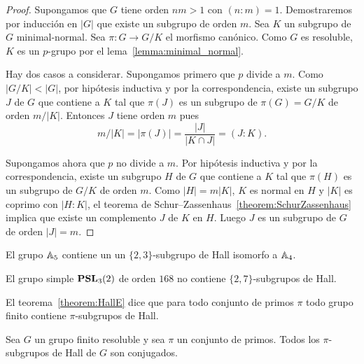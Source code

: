 \begin{proof}
	Supongamos que $G$ tiene orden $nm>1$ con $(n:m)=1$. Demostraremos por
	inducción en $|G|$ que 	existe un subgrupo de orden $m$. Sea $K$ un
	subgrupo de $G$ minimal-normal. Sea $\pi\colon G\to G/K$ el morfismo
	canónico.  Como $G$ es resoluble, $K$ es un $p$-grupo por el
	lema~\ref{lemma:minimal_normal}.
	
	Hay dos casos a considerar.  Supongamos primero que $p$ divide a $m$. Como
	$|G/K|<|G|$, por hipótesis inductiva y por la correspondencia, existe un
	subgrupo $J$ de $G$ que contiene a $K$ tal que $\pi(J)$ es un subgrupo de
	$\pi(G)=G/K$ de orden $m/|K|$. Entonces $J$ tiene orden $m$ pues 
	\[
	m/|K|=|\pi(J)|=\frac{|J|}{|K\cap J|}=(J:K).
	\]

	Supongamos ahora que $p$ no divide a $m$. Por hipótesis inductiva y por la
	correspondencia, existe un subgrupo $H$ de $G$ que contiene a $K$ tal que
	$\pi(H)$ es un subgrupo de $G/K$ de orden $m$.  Como $|H|=m|K|$, $K$ es
	normal en $H$ y $|K|$ es coprimo con $|H:K|$, el teorema de
	Schur--Zassenhaus~\ref{theorem:SchurZassenhaus} implica que existe un
	complemento $J$ de $K$ en $H$. Luego $J$ es un subgrupo de $G$ de orden
	$|J|=m$.
\end{proof}

\begin{example}
	El grupo $\mathbb{A}_5$ contiene un un $\{2,3\}$-subgrupo de Hall isomorfo a
	$\mathbb{A}_4$.
\end{example}

\begin{example}
	El grupo simple $\mathbf{PSL}_3(2)$ de orden $168$ no contiene $\{2,7\}$-subgrupos
	de Hall.
\end{example}

El teorema~\ref{theorem:HallE} dice que para todo conjunto de primos $\pi$
todo grupo finito contiene $\pi$-subgrupos de Hall.

\begin{theorem}[Hall]
	\label{theorem:HallC}
	Sea $G$ un grupo finito resoluble y sea $\pi$ un conjunto de primos. Todos los
	$\pi$-subgrupos de Hall de $G$ son conjugados.
\end{theorem}

